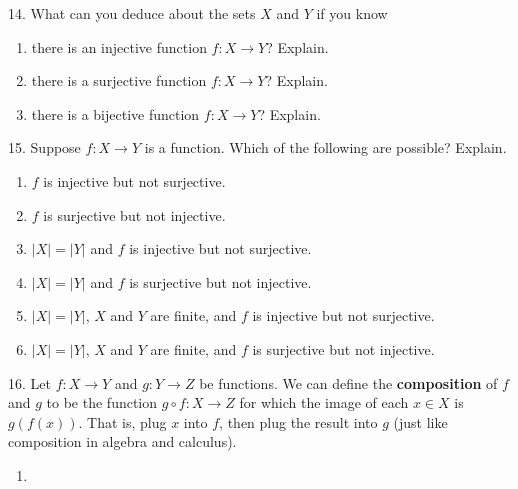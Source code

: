 \documentclass[10pt,]{book}
\newcommand{\terminology}[1]{\textbf{#1}}
\theoremstyle{plain}
\theoremstyle{definition}
\theoremstyle{definition}
\numberwithin{equation}{chapter}
\begin{document}
\begin{exerciselist}
\item[14.]\hypertarget{exercise-60}{}\hypertarget{p-766}{}%
What can you deduce about the sets \(X\) and \(Y\) if you know \textellipsis{} \leavevmode%
\begin{enumerate}[label=(\alph*)]
\item\hypertarget{li-503}{}\hypertarget{p-767}{}%
there is an injective function \(f:X \to Y\)? Explain.%
\item\hypertarget{li-504}{}\hypertarget{p-768}{}%
there is a surjective function \(f:X \to Y\)? Explain.%
\item\hypertarget{li-505}{}\hypertarget{p-769}{}%
there is a bijective function \(f:X \to Y\)? Explain.%
\end{enumerate}
%
\par\smallskip
\item[15.]\hypertarget{exercise-61}{}\hypertarget{p-774}{}%
Suppose \(f:X \to Y\) is a function. Which of the following are possible? Explain. \leavevmode%
\begin{enumerate}[label=(\alph*)]
\item\hypertarget{li-509}{}\(f\) is injective but not surjective.%
\item\hypertarget{li-510}{}\(f\) is surjective but not injective.%
\item\hypertarget{li-511}{}\(|X| = |Y|\) and \(f\) is injective but not surjective.%
\item\hypertarget{li-512}{}\(|X| = |Y|\) and \(f\) is surjective but not injective.%
\item\hypertarget{li-513}{}\(|X| = |Y|\), \(X\) and \(Y\) are finite, and \(f\) is injective but not surjective.%
\item\hypertarget{li-514}{}\(|X| = |Y|\), \(X\) and \(Y\) are finite, and \(f\) is surjective but not injective.%
\end{enumerate}
%
\par\smallskip
\item[16.]\hypertarget{exercise-62}{}\hypertarget{p-782}{}%
Let \(f:X \to Y\) and \(g:Y \to Z\) be functions.  We can define the \terminology{composition} of \(f\) and \(g\) to be the function \(g\circ f:X \to Z\) for which the image of each \(x \in X\) is \(g(f(x))\).  That is, plug \(x\) into \(f\), then plug the result into \(g\) (just like composition in algebra and calculus).%
\par
\hypertarget{p-783}{}%
\leavevmode%
\begin{enumerate}[label=(\alph*)]
\item\hypertarget{li-521}{}\hypertarget{p-784}{}%

\end{enumerate}
\end{exerciselist}
\end{document}

